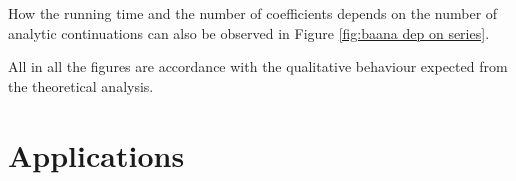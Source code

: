 		How the running time and the number of coefficients  depends on the number of analytic continuations can also be observed in Figure \ref{fig:baana dep on series}. 

		All in all the figures are accordance with the qualitative behaviour expected from the theoretical analysis.
	\section{Applications}